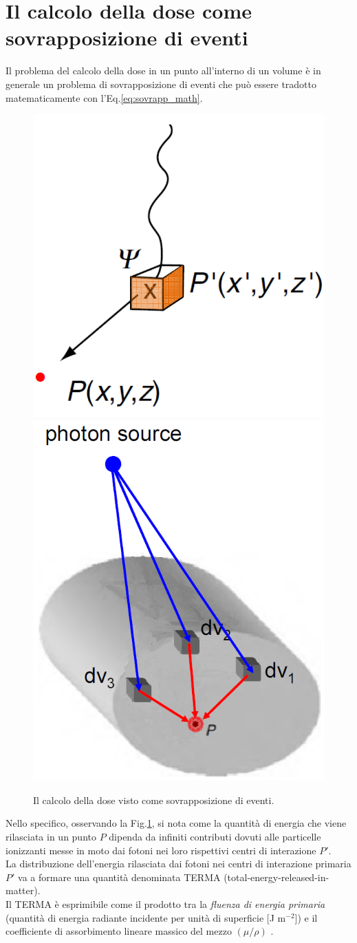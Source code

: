 {\section{Il calcolo della dose come sovrapposizione di eventi}
\label{sec:teoria_conv}
Il problema del calcolo della dose in un punto all'interno di un volume è in generale un problema di sovrapposizione di eventi che può essere tradotto matematicamente con l'Eq.\eqref{eq:sovrapp_math}.
\begin{figure}
\centering
\includegraphics[width=.45\textwidth]{./cap1/superp1.png}
\includegraphics[width=.45\textwidth]{./cap1/superp2.png}
\caption{Il calcolo della dose visto come sovrapposizione di eventi.}
\label{fig:superp}
\end{figure}

Nello specifico, osservando la Fig.\ref{fig:superp}, si nota come la quantità di energia che viene rilasciata in un punto $P$ dipenda da infiniti contributi dovuti alle particelle ionizzanti messe in moto dai fotoni nei loro rispettivi centri di interazione $P'$.\\
La distribuzione dell'energia rilasciata dai fotoni nei centri di interazione primaria $P'$ va a formare una quantità denominata TERMA (total-energy-released-in-matter).  \\
Il TERMA è esprimibile come il prodotto tra la \textit{fluenza di energia primaria} (quantità di energia radiante incidente per unità di superficie [J m$^{-2}$]) e il coefficiente di assorbimento lineare massico del mezzo $(\mu/\rho)$ \cite{Ahnesjo1987}.

}
